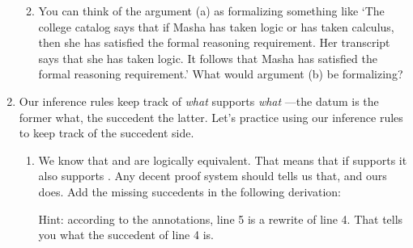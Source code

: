 \begin{enumerate}
\begin{enumerate}
\begin{argument*}




\end{argument*}



   \item You can think of the argument (a) as formalizing something like `The 
	college catalog says that if Masha has taken logic or has taken calculus, 
	then she has satisfied the formal reasoning requirement.  Her transcript 
	says that she has taken logic.  It follows that Masha has satisfied the 
	formal reasoning requirement.' What would argument (b) be formalizing? 

\end{enumerate}

\item Our inference rules keep track of \emph{what} supports \emph{what}
 ---the datum is the former what, the succedent the latter. Let's practice 
 using our inference rules to keep track of the succedent side.

 \begin{enumerate}

  \item  We know that  and  are logically equivalent.  
   That means that if \p{\Gamma} supports  it also supports 
   . Any decent proof system should tells us that, and ours does.  
   Add the missing succedents in the following derivation:

\begin{argument*}






\end{argument*}


   
   Hint: according to the annotations, line 5 is a rewrite of line 4. That tells 
   you what the succedent of line 4 is.



\end{enumerate}
\end{enumerate}
